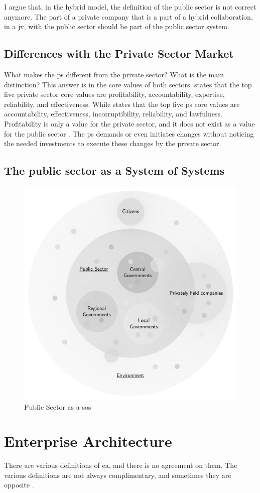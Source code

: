 I argue that, in the hybrid model, the definition of the public sector is not correct anymore. The part of a private company that is a part of a hybrid collaboration, in a \gls{jv}, with the public sector should be part of the public sector system.

\subsection{Differences with the Private Sector Market}
\label{sub:tbdifferenceprivatesector}
What makes the \gls{ps} different from the private sector? What is the main distinction? This answer is in the core values of both sectors. \textcite{Wal2008} states that the top five private sector core values are profitability, accountability, expertise, reliability, and effectiveness. While \textcite{Wal2008} states that the top five \gls{ps} core values are accountability, effectiveness, incorruptibility, reliability, and lawfulness. Profitability is only a value for the private sector, and it does not exist as a value for the public sector \parencite{Wal2008}. The \gls{ps} demands or even initiates changes without noticing the needed investments to execute these changes by the private sector.

\subsection{The public sector as a System of Systems}
\label{sub:tbpssystemofsystems}

\begin{figure}[H]
	\centering
	\includegraphics[width=0.5\linewidth]{images/pssystemofsystems}
	\caption[Public Sector as a \acrlong{sos}]{Public Sector as a \acrlong{sos}}
	\label{fig:pssystemofsystems}
\end{figure}


\section{Enterprise Architecture}
\label{sec:tbenterprisearchitecture}
There are various definitions of \acrlong{ea}, and there is no agreement on them. The various definitions are not always complimentary, and sometimes they are opposite \parencites{Lapalme2012}{SaintLouis2019}{Hoogervorst2009}. 


